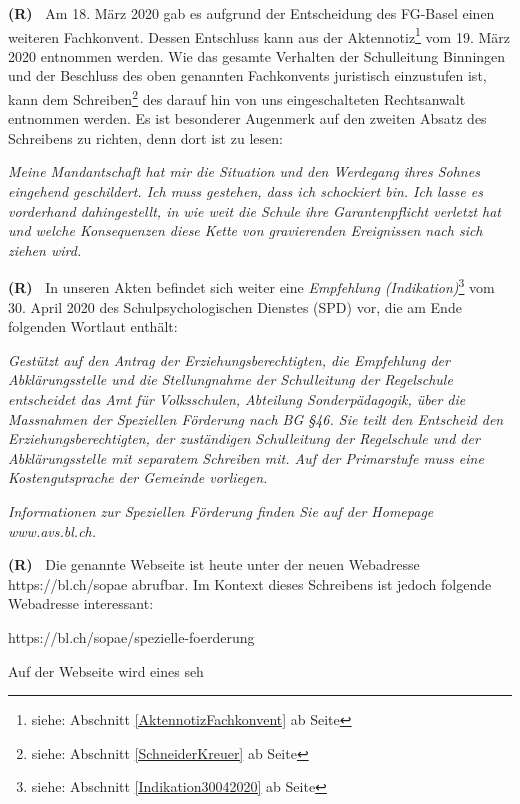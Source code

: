 \documentclass[paper=a4,fontsize=12pt, oneside, numbers=noenddot]{scrbook}
\newcounter{rz}
\newcommand{\Rz}{
	\addtocounter{rz}{1}\textbf{(R\arabic{rz})~}
}
\newcommand{\footnoteExt}[1]{\footnote{siehe: Abschnitt \ref{#1} ab Seite \pageref{#1}}}
\begin{document}
\Rz Am 18. März 2020 gab es aufgrund der Entscheidung des FG-Basel einen weiteren Fachkonvent. Dessen Entschluss kann aus der Aktennotiz\footnoteExt{AktennotizFachkonvent} vom 19. März 2020 entnommen werden. Wie das gesamte Verhalten der Schulleitung Binningen und der Beschluss des oben genannten Fachkonvents juristisch einzustufen ist, kann dem Schreiben\footnoteExt{SchneiderKreuer} des darauf hin von uns eingeschalteten Rechtsanwalt entnommen werden. Es ist besonderer Augenmerk auf den zweiten Absatz des Schreibens zu richten, denn dort ist zu lesen:
\begin{addmargin}[2.5em]{0em}\emph{Meine Mandantschaft hat mir die Situation und den Werdegang ihres Sohnes eingehend geschildert. Ich muss gestehen, dass ich schockiert bin. Ich lasse es vorderhand dahingestellt, in wie weit die Schule ihre Garantenpflicht verletzt hat und welche Konsequenzen diese Kette von gravierenden Ereignissen nach sich ziehen wird.}
\end{addmargin}


\Rz In unseren Akten befindet sich weiter eine \textit{Empfehlung (Indikation)}\footnoteExt{Indikation30042020} vom 30. April 2020 des Schulpsychologischen Dienstes (SPD) vor, die am Ende folgenden Wortlaut enthält:

\begin{addmargin}[2.5em]{0em}\emph{Gestützt auf den Antrag der Erziehungsberechtigten, die Empfehlung der Abklärungsstelle und die Stellungnahme der Schulleitung der Regelschule entscheidet das Amt für Volksschulen, Abteilung Sonderpädagogik, über die Massnahmen der Speziellen Förderung nach BG §46. Sie teilt den Entscheid den Erziehungsberechtigten, der zuständigen Schulleitung der Regelschule und der Abklärungsstelle mit separatem Schreiben mit. Auf der Primarstufe muss eine Kostengutsprache der Gemeinde vorliegen.}
	
\emph{Informationen zur Speziellen Förderung finden Sie auf der Homepage www.avs.bl.ch.}
\end{addmargin}

\Rz Die genannte Webseite ist heute unter der neuen Webadresse https://bl.ch/sopae abrufbar. Im Kontext dieses Schreibens ist jedoch folgende Webadresse interessant:

https://bl.ch/sopae/spezielle-foerderung

Auf der Webseite wird eines seh
\end{document}
